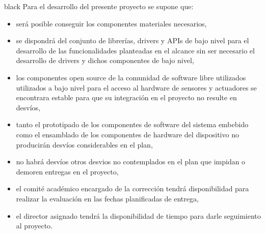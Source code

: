 \documentclass[
11pt, %
codirector, %
]{charter}
\begin{document}
\begin{consigna}{black}
Para el desarrollo del presente proyecto se supone que: 

\begin{itemize}
	\item será posible conseguir los componentes materiales necesarios,
	\item se dispondrá del conjunto de librerías, drivers y APIs de bajo nivel para el desarrollo de las funcionalidades planteadas en el alcance sin ser necesario el desarrollo de drivers y dichos componentes de bajo nivel,
	\item los componentes open source de la comunidad de software libre utilizados utilizados a bajo nivel para el acceso al hardware de sensores y actuadores se encontrara estable para que su integración en el proyecto no resulte en desvíos,	
	\item tanto el prototipado de los componentes de software del sistema embebido como el ensamblado de los componentes de hardware del dispositivo no producirán desvíos considerables en el plan,
	\item no habrá desvíos otros desvios no contemplados en el plan que impidan o demoren entregas en el proyecto,
	\item el comité académico encargado de la corrección tendrá disponibilidad para realizar la evaluación en las fechas planificadas de entrega,
	\item el director asignado tendrá la disponibilidad de tiempo para darle seguimiento al proyecto.
\end{itemize}


\end{consigna}
\end{document}
